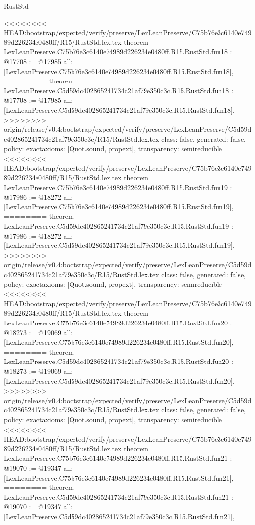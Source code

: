 \begin{lexlean}{RustStd}
\begin{coremodule}
{\begin{coremodule}
{{{{{{{{{{{{{{{{{{{{{}
<<<<<<<< HEAD:bootstrap/expected/verify/preserve/LexLeanPreserve/C75b76e3c6140e74989d226234e0480ff/R15/RustStd.lex.tex
theorem LexLeanPreserve.C75b76e3c6140e74989d226234e0480ff.R15.RustStd.fun18 : @17708 := @17985 {
  all: [LexLeanPreserve.C75b76e3c6140e74989d226234e0480ff.R15.RustStd.fun18],
========
theorem LexLeanPreserve.C5d59dc402865241734c21af79e350c3c.R15.RustStd.fun18 : @17708 := @17985 {
  all: [LexLeanPreserve.C5d59dc402865241734c21af79e350c3c.R15.RustStd.fun18],
>>>>>>>> origin/release/v0.4:bootstrap/expected/verify/preserve/LexLeanPreserve/C5d59dc402865241734c21af79e350c3c/R15/RustStd.lex.tex
  class: false,
  generated: false,
  policy: exact{axioms: [Quot.sound, propext]},
  transparency: semireducible
}
<<<<<<<< HEAD:bootstrap/expected/verify/preserve/LexLeanPreserve/C75b76e3c6140e74989d226234e0480ff/R15/RustStd.lex.tex
theorem LexLeanPreserve.C75b76e3c6140e74989d226234e0480ff.R15.RustStd.fun19 : @17986 := @18272 {
  all: [LexLeanPreserve.C75b76e3c6140e74989d226234e0480ff.R15.RustStd.fun19],
========
theorem LexLeanPreserve.C5d59dc402865241734c21af79e350c3c.R15.RustStd.fun19 : @17986 := @18272 {
  all: [LexLeanPreserve.C5d59dc402865241734c21af79e350c3c.R15.RustStd.fun19],
>>>>>>>> origin/release/v0.4:bootstrap/expected/verify/preserve/LexLeanPreserve/C5d59dc402865241734c21af79e350c3c/R15/RustStd.lex.tex
  class: false,
  generated: false,
  policy: exact{axioms: [Quot.sound, propext]},
  transparency: semireducible
}
<<<<<<<< HEAD:bootstrap/expected/verify/preserve/LexLeanPreserve/C75b76e3c6140e74989d226234e0480ff/R15/RustStd.lex.tex
theorem LexLeanPreserve.C75b76e3c6140e74989d226234e0480ff.R15.RustStd.fun20 : @18273 := @19069 {
  all: [LexLeanPreserve.C75b76e3c6140e74989d226234e0480ff.R15.RustStd.fun20],
========
theorem LexLeanPreserve.C5d59dc402865241734c21af79e350c3c.R15.RustStd.fun20 : @18273 := @19069 {
  all: [LexLeanPreserve.C5d59dc402865241734c21af79e350c3c.R15.RustStd.fun20],
>>>>>>>> origin/release/v0.4:bootstrap/expected/verify/preserve/LexLeanPreserve/C5d59dc402865241734c21af79e350c3c/R15/RustStd.lex.tex
  class: false,
  generated: false,
  policy: exact{axioms: [Quot.sound, propext]},
  transparency: semireducible
}
<<<<<<<< HEAD:bootstrap/expected/verify/preserve/LexLeanPreserve/C75b76e3c6140e74989d226234e0480ff/R15/RustStd.lex.tex
theorem LexLeanPreserve.C75b76e3c6140e74989d226234e0480ff.R15.RustStd.fun21 : @19070 := @19347 {
  all: [LexLeanPreserve.C75b76e3c6140e74989d226234e0480ff.R15.RustStd.fun21],
========
theorem LexLeanPreserve.C5d59dc402865241734c21af79e350c3c.R15.RustStd.fun21 : @19070 := @19347 {
  all: [LexLeanPreserve.C5d59dc402865241734c21af79e350c3c.R15.RustStd.fun21],
}}}}}}}}}}}}}}}}}}}}}}}}}
\end{coremodule}}
\end{coremodule}
\end{lexlean}
